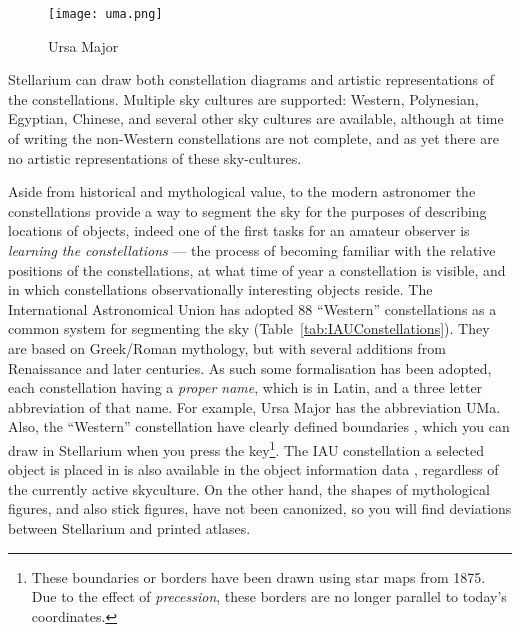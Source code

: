 \begin{figure}[hb]
\centering\texttt{[image: uma.png]}
\caption{Ursa Major}
\label{fig:ursamajor}
\end{figure}


Stellarium can draw both constellation diagrams and artistic
representations of the constellations. Multiple sky cultures are
supported: Western, Polynesian, Egyptian, Chinese, and several other sky cultures are
available, although at time of writing the non-Western constellations
are not complete, and as yet there are no artistic representations of
these sky-cultures.

Aside from historical and mythological value, to the modern astronomer
the constellations provide a way to segment the sky for the purposes
of describing locations of objects, indeed one of the first tasks for
an amateur observer is \emph{learning the constellations} --- the
process of becoming familiar with the relative positions of the
constellations, at what time of year a constellation is visible, and
in which constellations observationally interesting objects reside.
The International Astronomical Union has adopted 88 ``Western''
constellations as a common system for segmenting the sky (Table~\ref{tab:IAUConstellations}). They are
based on Greek/Roman mythology, but with several additions from
Renaissance and later centuries.  As such some formalisation has been
adopted, each constellation having a \emph{proper name}, which is in
Latin, and a three letter abbreviation of that name.  For example,
Ursa Major has the abbreviation UMa. Also, the ``Western''
constellation have clearly defined boundaries \citep{Delporte:1930}, which you can draw in
Stellarium when you press the  key\footnote{These boundaries or
  borders have been drawn using star maps from 1875. Due to the effect
  of \emph{precession}, these borders are no longer parallel to
  today's coordinates.}. The IAU constellation a selected object is placed in 
is also available in the object information data \citep{1987PASP...99..695R}, 
regardless of the currently active skyculture.  On the other hand, the shapes 
of mythological figures, and also stick figures, have not been canonized, so 
you will find deviations between Stellarium and printed atlases.


